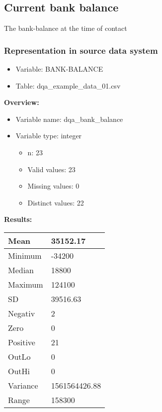 \documentclass[
]{article}
\providecommand{\tightlist}{%
  \setlength{\itemsep}{0pt}\setlength{\parskip}{0pt}}
\begin{document}
\newpage

\hypertarget{current-bank-balance}{%
\subsection{Current bank balance}\label{current-bank-balance}}

The bank-balance at the time of contact

\hypertarget{representation-in-source-data-system-4}{%
\subsubsection{\texorpdfstring{Representation in \textbf{source} data
system}{Representation in source data system}}\label{representation-in-source-data-system-4}}

\begin{itemize}
\tightlist
\item
  Variable: BANK-BALANCE
\item
  Table: dqa\_example\_data\_01.csv
\end{itemize}

\textbf{Overview:}

\begin{itemize}
\tightlist
\item
  Variable name: dqa\_bank\_balance
\item
  Variable type: integer

  \begin{itemize}
  \tightlist
  \item
    n: 23
  \item
    Valid values: 23
  \item
    Missing values: 0
  \item
    Distinct values: 22
  \end{itemize}
\end{itemize}

\textbf{Results:}\\

\begin{table}[H]
\centering
\begin{tabular}{l|l}
\hline
Mean & 35152.17\\
\hline
Minimum & -34200\\
\hline
Median & 18800\\
\hline
Maximum & 124100\\
\hline
SD & 39516.63\\
\hline
Negativ & 2\\
\hline
Zero & 0\\
\hline
Positive & 21\\
\hline
OutLo & 0\\
\hline
OutHi & 0\\
\hline
Variance & 1561564426.88\\
\hline
Range & 158300\\
\hline
\end{tabular}
\end{table}
\end{document}
